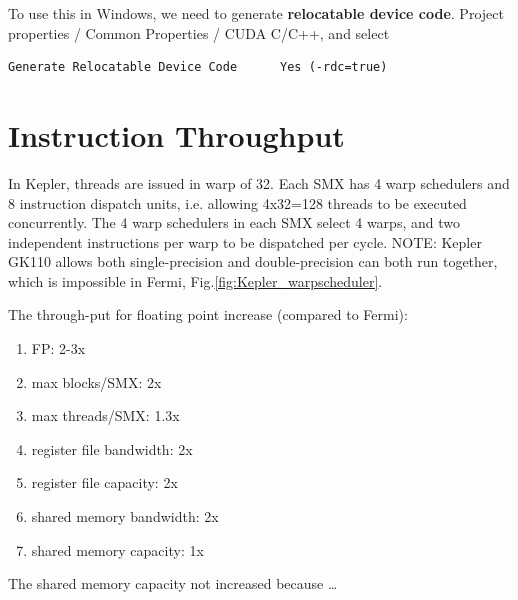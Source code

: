 To use this in Windows, we need to generate {\bf relocatable device code}.
Project properties / Common Properties / CUDA C/C++, and select 
\begin{verbatim}
Generate Relocatable Device Code      Yes (-rdc=true)
\end{verbatim}


\section{Instruction Throughput}
 
In Kepler, threads are issued in warp of 32. Each SMX has 4 warp schedulers and
8 instruction dispatch units, i.e.
allowing 4x32=128 threads to be executed concurrently. The 4 warp schedulers in
each SMX select 4 warps, and two independent instructions per warp to be
dispatched per cycle. NOTE:  Kepler GK110 allows both single-precision and
double-precision can both run together, which is impossible in Fermi,
Fig.\ref{fig:Kepler_warpscheduler}.

 
The through-put for floating point increase (compared to Fermi):
\begin{enumerate}
  \item FP: 2-3x
  \item max blocks/SMX: 2x
  \item max threads/SMX: 1.3x
  \item register file bandwidth: 2x
  \item register file capacity: 2x
  \item shared memory bandwidth: 2x
  \item shared memory capacity: 1x
\end{enumerate}
The shared memory capacity not increased because \ldots


